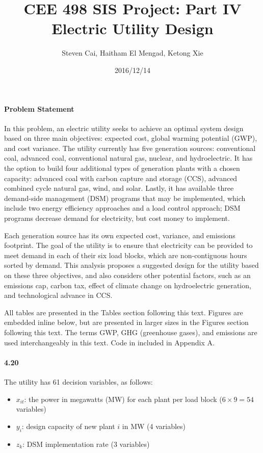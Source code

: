 \documentclass{article}
\title{CEE 498 SIS Project: Part IV \\ Electric Utility Design}
\date{2016/12/14}
\author{Steven Cai, Haitham El Mengad, Ketong Xie}
\begin{document}
\maketitle
\setcounter{section}{4}

\paragraph{Problem Statement}
	In this problem, an electric utility seeks to achieve an optimal system design based on three main objectives: expected cost, global warming potential (GWP), and cost variance. The utility currently has five generation sources: conventional coal, advanced coal, conventional natural gas, nuclear, and hydroelectric. It has the option to build four additional types of generation plants with a chosen capacity: advanced coal with carbon capture and storage (CCS), advanced combined cycle natural gas, wind, and solar. Lastly, it has available three demand-side management (DSM) programs that may be implemented, which include two energy efficiency approaches and a load control approach; DSM programs decrease demand for electricity, but cost money to implement.
	
	Each generation source has its own expected cost, variance, and emissions footprint. The goal of the utility is to ensure that electricity can be provided to meet demand in each of their six load blocks, which are non-contiguous hours sorted by demand. This analysis proposes a suggested design for the utility based on these three objectives, and also considers other potential factors, such as an emissions cap, carbon tax, effect of climate change on hydroelectric generation, and technological advance in CCS.
	
	All tables are presented in the Tables section following this text. Figures are embedded inline below, but are presented in larger sizes in the Figures section following this text. The terms GWP, GHG (greenhouse gases), and emissions are used interchangeably in this text. Code in included in Appendix A.


\paragraph{4.20}
	The utility has 61 decision variables, as follows:
	
	\begin{itemize}
		\item $x_{it}$: the power in megawatts (MW) for each plant per load block ($6 \times 9 = 54$ variables)
		\item $y_i$: design capacity of new plant $i$ in MW (4 variables)
		\item $z_k$: DSM implementation rate (3 variables)
	\end{itemize}
	
\end{document}
